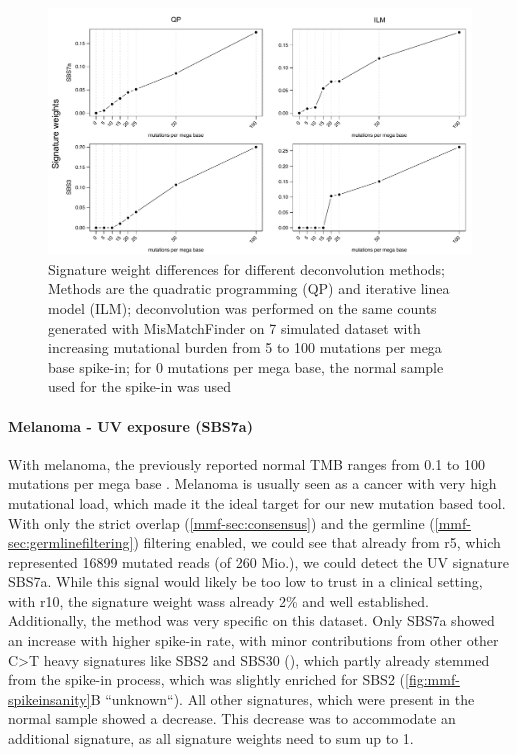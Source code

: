 \begin{figure}[ht]
\centering
\includegraphics[width=.99\linewidth]{Figures/MisMatchFinder/deconstructionMethodsDifferences.pdf}
\caption[Signature weight differences for different deconvolution methods]{Signature weight differences for different deconvolution methods; Methods are the quadratic programming (QP) and iterative linea model (ILM); deconvolution was performed on the same counts generated with MisMatchFinder on 7 simulated dataset with increasing mutational burden from 5 to 100 mutations per mega base spike-in; for 0 mutations per mega base, the normal sample used for the spike-in was used}\label{fig:mmf-methodDifferences}
\end{figure}


\paragraph{Melanoma - UV exposure (SBS7a)}
\label{mmf-sec:melaSim}

With melanoma, the previously reported normal TMB ranges from 0.1 to 100 mutations per mega base \cite{Alexandrov2020}. Melanoma is usually seen as a cancer with very high mutational load, which made it the ideal target for our new mutation based tool. With only the strict overlap (\autoref{mmf-sec:consensus}) and the germline (\autoref{mmf-sec:germlinefiltering}) filtering enabled, we could see that already from r5, which represented 16899 mutated reads (of 260 Mio.), we could detect the UV signature SBS7a. While this signal would likely be too low to trust in a clinical setting, with r10, the signature weight wass already 2\% and well established. Additionally, the method was very specific on this dataset. Only SBS7a showed an increase with higher spike-in rate, with minor contributions from other other C>T heavy signatures like SBS2 and SBS30 (), which partly already stemmed from the spike-in process, which was slightly enriched for SBS2 (\autoref{fig:mmf-spikeinsanity}B ``unknown``). All other signatures, which were present in the normal sample showed a decrease. This decrease was to accommodate an additional signature, as all signature weights need to sum up to 1.



